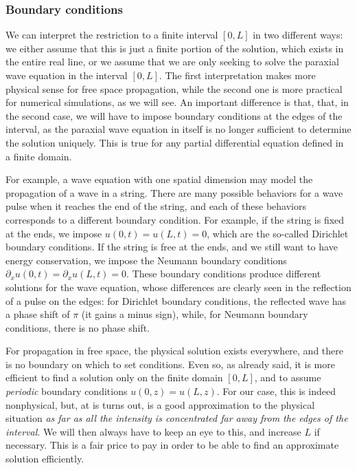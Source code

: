 \documentclass[openany,a4paper,oneside,11pt]{article}
\begin{document}
\subsubsection{Boundary conditions}

We can interpret the restriction to a finite interval $[0, L]$ in two different ways: we either assume that this is just a finite portion of the solution, which exists in the entire real line, or we assume that we are only seeking to solve the paraxial wave equation in the interval $[0, L]$. The first interpretation makes more physical sense for free space propagation, while the second one is more practical for numerical simulations, as we will see. An important difference is that, that, in the second case, we will have to impose boundary conditions at the edges of the interval, as the paraxial wave equation in itself is no longer sufficient to determine the solution uniquely. This is true for any partial differential equation defined in a finite domain. 

For example, a wave equation with one spatial dimension may model the propagation of a wave in a string. There are many possible behaviors for a wave pulse when it reaches the end of the string, and each of these behaviors corresponds to a different boundary condition. For example, if the string is fixed at the ends, we impose $u(0,t) = u(L,t) = 0$, which are the so-called Dirichlet boundary conditions. If the string is free at the ends, and we still want to have energy conservation, we impose the Neumann boundary conditions $\partial_x u(0,t) = \partial_x u(L,t) = 0$. These boundary conditions produce different solutions for the wave equation, whose differences are clearly seen in the reflection of a pulse on the edges: for Dirichlet boundary conditions, the reflected wave has a phase shift of $\pi$ (it gains a minus sign), while, for Neumann boundary conditions, there is no phase shift.

For propagation in free space, the physical solution exists everywhere, and there is no boundary on which to set conditions. Even so, as already said, it is more efficient to find a solution only on the finite domain $[0,L]$, and to assume \textit{periodic} boundary conditions $u(0,z) = u(L,z)$. For our case, this is indeed nonphysical, but, at is turns out, is a good approximation to the physical situation \textit{as far as all the intensity is concentrated far away from the edges of the interval}. We will then always have to keep an eye to this, and increase $L$ if necessary. This is a fair price to pay in order to be able to find an approximate solution efficiently.
\end{document}
